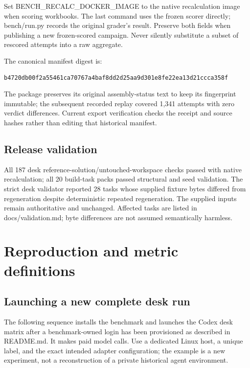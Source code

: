 Set BENCH\_RECALC\_DOCKER\_IMAGE to the native recalculation image when scoring workbooks. The last command uses the frozen scorer directly; bench/run.py records the original grader's result. Preserve both fields when publishing a new frozen-scored campaign. Never silently substitute a subset of rescored attempts into a raw aggregate.

The canonical manifest digest is:

\begin{verbatim}
b4720db00f2a55461ca70767a4baf8dd2d25aa9d301e8fe22ea13d21ccca358f
\end{verbatim}

The package preserves its original assembly-status text to keep its fingerprint immutable; the subsequent recorded replay covered 1,341 attempts with zero verdict differences. Current export verification checks the receipt and source hashes rather than editing that historical manifest.

\subsection{Release validation}\label{release-validation}

All 187 desk reference-solution/untouched-workspace checks passed with native recalculation; all 20 build-task packs passed structural and seed validation. The strict desk validator reported 28 tasks whose supplied fixture bytes differed from regeneration despite deterministic repeated regeneration. The supplied inputs remain authoritative and unchanged. Affected tasks are listed in docs/validation.md; byte differences are not assumed semantically harmless.

\section{Reproduction and metric definitions}\label{app:B}

\subsection{Launching a new complete desk run}\label{launching-a-new-complete-desk-run}

The following sequence installs the benchmark and launches the Codex desk matrix after a benchmark-owned login has been provisioned as described in README.md. It makes paid model calls. Use a dedicated Linux host, a unique label, and the exact intended adapter configuration; the example is a new experiment, not a reconstruction of a private historical agent environment.

